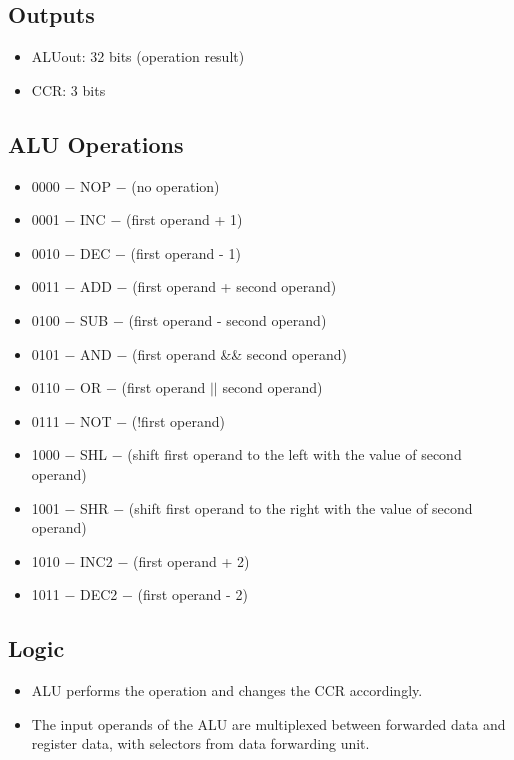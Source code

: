 \subsection{Outputs}
\begin{itemize}
    \item ALUout: 32 bits (operation result)
    \item CCR: 3 bits
\end{itemize}

\subsection{ALU Operations}
\begin{itemize}
    \item 0000 $-$ NOP $-$ (no operation)
    \item 0001 $-$ INC $-$ (first operand + 1)
    \item 0010 $-$ DEC $-$ (first operand - 1)
    \item 0011 $-$ ADD $-$ (first operand + second operand)
    \item 0100 $-$ SUB $-$ (first operand - second operand)
    \item 0101 $-$ AND $-$ (first operand \&\& second operand)
    \item 0110 $-$ OR $-$ (first operand $||$ second operand)
    \item 0111 $-$ NOT $-$ (!first operand)
    \item 1000 $-$ SHL $-$ (shift first operand to the left with the value of second operand)
    \item 1001 $-$ SHR $-$ (shift first operand to the right with the value of second operand)
    \item 1010 $-$ INC2 $-$ (first operand + 2)
    \item 1011 $-$ DEC2 $-$ (first operand - 2)
\end{itemize}

\subsection{Logic}
\begin{itemize}
    \item ALU performs the operation and changes the CCR accordingly.
    \item The input operands of the ALU are multiplexed between forwarded data and register data, with selectors from data forwarding unit.
\end{itemize}


